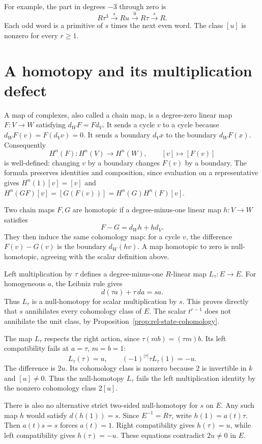 For example, the part in degrees $-3$ through zero is
\[
 R\tau^3\xrightarrow{\ s\ }Ru
 \xrightarrow{\ 0\ }R\tau\xrightarrow{\ s\ }R.
\]
Each odd word is a primitive of $s$ times the next even word.
The class $[u]$ is nonzero for every $r\geq1$.

\section{A homotopy and its multiplication defect}
\label{sec:rel-state-homotopy}

A map of complexes, also called a chain map, is a degree-zero linear map
$F:V\to W$ satisfying $d_WF=Fd_V$.
It sends a cycle $v$ to a cycle because $d_WF(v)=F(d_Vv)=0$.
It sends a boundary $d_Vx$ to the boundary $d_WF(x)$.
Consequently
\[
 H^n(F):H^n(V)\longrightarrow H^n(W),\qquad [v]\longmapsto[F(v)]
\]
is well-defined: changing $v$ by a boundary changes $F(v)$ by a boundary.
The formula preserves identities and composition, since evaluation on
a representative gives $H^n(1)[v]=[v]$ and
$H^n(GF)[v]=[G(F(v))]=H^n(G)H^n(F)[v]$.

Two chain maps $F,G$ are homotopic if a degree-minus-one linear map
$h:V\to W$ satisfies
\[
 F-G=d_Wh+hd_V.
\]
They then induce the same cohomology map: for a cycle $v$, the difference
$F(v)-G(v)$ is the boundary $d_W(hv)$.
A map homotopic to zero is null-homotopic, agreeing with the scalar
definition above.

Left multiplication by $\tau$ defines a degree-minus-one $R$-linear map
$L_\tau:E\to E$. For homogeneous $a$, the Leibniz rule gives
\begin{equation}\label{eq:rel-left-homotopy}
 d(\tau a)+\tau\,da=s a.
\end{equation}
Thus $L_\tau$ is a null-homotopy for scalar multiplication by $s$.
This proves directly that $s$ annihilates every cohomology class of $E$.
The scalar $t^{r-1}$ does not annihilate the unit class, by
Proposition~\ref{prop:rel-state-cohomology}.

The map $L_\tau$ respects the right action, since $\tau(mb)=(\tau m)b$.
Its left compatibility fails at $a=\tau$, $m=b=1$:
\[
 L_\tau(\tau)=u,\qquad
 (-1)^{|\tau|}\tau L_\tau(1)=-u.
\]
The difference is $2u$. Its cohomology class is nonzero because $2$ is
invertible in $k$ and $[u]\ne0$.
Thus the null-homotopy $L_\tau$ fails the left multiplication identity
by the nonzero cohomology class $2[u]$.

There is also no alternative strict two-sided null-homotopy for $s$ on
$E$. Any such map $h$ would satisfy $d(h(1))=s$.
Since $E^{-1}=R\tau$, write $h(1)=a(t)\tau$.
Then $a(t)s=s$ forces $a(t)=1$.
Right compatibility gives $h(\tau)=u$, while left compatibility gives
$h(\tau)=-u$. These equations contradict $2u\ne0$ in $E$.

